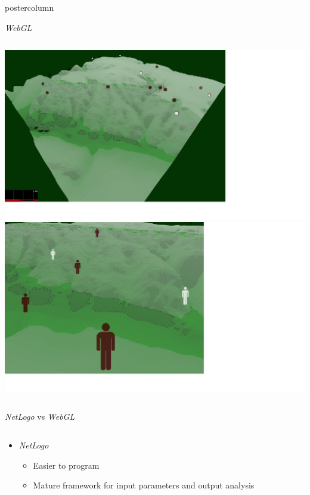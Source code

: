 \documentclass[final,hyperref={pdfpagelabels=false}]{beamer}
\begin{document}
\begin{frame}
\begin{columns}
\begin{column}{.33\textwidth}
\begin{beamercolorbox}[center,wd=\textwidth]{postercolumn}
\begin{minipage}[T]{.95\textwidth}
{            \vfill
            \begin{block}{\textit{WebGL}}
              \begin{columns}
                \begin{column}{.99\textwidth}
                  \includegraphics[width=0.88\linewidth]{images/fp2}
                  \-
                  \includegraphics[width=0.88\linewidth]{images/fp3}
                \end{column}
              \end{columns}
            \end{block}
            \vfill
            \begin{block}{\textit{NetLogo} vs \textit{WebGL}}
              \begin{columns}
                \begin{column}{.99\textwidth}
                  \begin{itemize}
                    \item \textit{NetLogo}
                      \begin{itemize}
                        \item Easier to program
                        \item Mature framework for input parameters and output analysis

\end{itemize}
\end{itemize}
\end{column}
\end{columns}
\end{block}}
\end{minipage}
\end{beamercolorbox}
\end{column}
\end{columns}
\end{frame}
\end{document}
